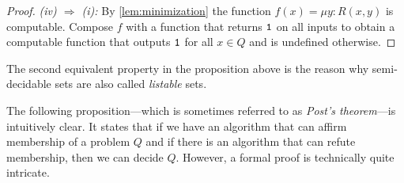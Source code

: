 \begin{proof}
  \emph{(iv) \(⇒\) (i):} By \cref{lem:minimization} the function \(f(x) = μy :
  R(x, y)\) is computable. Compose \(f\) with a function that returns \(\mathtt{1}\)
  on all inputs to obtain a computable function that outputs \(\mathtt{1}\) for all
  \(x ∈ Q\) and is undefined otherwise.
\end{proof}



\begin{rem}
  The second equivalent property in the proposition above is the reason why
  semi-decidable sets are also called \emph{listable} sets.
\end{rem}

The following proposition---which is sometimes referred to as \emph{Post's
theorem}---is intuitively clear. It states that if we have an algorithm
that can affirm membership of a problem \(Q\) and if there is an algorithm that
can refute membership, then we can decide \(Q\). However, a formal proof is
technically quite intricate.

